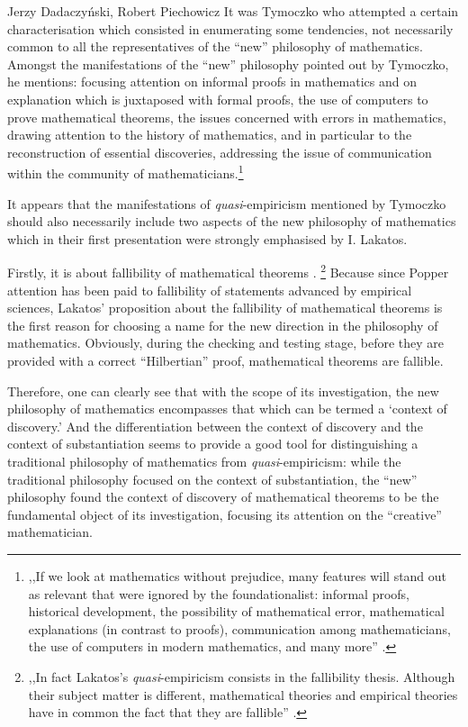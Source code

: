 \begin{artengenv}{Jerzy Dadaczyński, Robert Piechowicz}
It was Tymoczko who attempted a certain characterisation which consisted in enumerating some tendencies, not necessarily common to all the representatives of the ``new'' philosophy of mathematics. Amongst the manifestations of the ``new'' philosophy pointed out by Tymoczko, he mentions: focusing attention on informal proofs in mathematics and on explanation which is juxtaposed with formal proofs, the use of computers to prove mathematical theorems, the issues concerned with errors in mathematics, drawing attention to the history of mathematics, and in particular to the reconstruction of essential discoveries, addressing the issue of communication within the community of mathematicians.\footnote{,,If we look at mathematics without prejudice, many features will stand out as relevant that were ignored by the foundationalist: informal proofs, historical development, the possibility of mathematical error, mathematical explanations (in contrast to proofs), communication among mathematicians, the use of computers in modern mathematics, and many more''
\parencite[][p.xvi]{tymoczko_introduction_1986}.%
}

It appears that the manifestations of \textit{quasi}-empiricism mentioned by Tymoczko should also necessarily include two aspects of the new philosophy of mathematics which in their first presentation were strongly emphasised by I. Lakatos.

Firstly, it is about fallibility of mathematical theorems
\parencite[][p.139]{lakatos_proofs_1976}.%
\footnote{,,In fact Lakatos's \textit{quasi}-empiricism consists in the fallibility thesis. Although their subject matter is different, mathematical theories and empirical theories have in common the fact that they are fallible'' 
\parencite[][p.4]{koetsier_lakatos_1991}.%
} Because since Popper attention has been paid to fallibility of statements advanced by empirical sciences, Lakatos' proposition about the fallibility of mathematical theorems is the first reason for choosing a name for the new direction in the philosophy of mathematics. Obviously, during the checking and testing stage, before they are provided with a correct ``Hilbertian'' proof, mathematical theorems are fallible.

Therefore, one can clearly see that with the scope of its investigation, the new philosophy of mathematics encompasses that which can be termed a ‘context of discovery.' And the differentiation between the context of discovery and the context of substantiation seems to provide a good tool for distinguishing a traditional philosophy of mathematics from \textit{quasi}-empiricism: while the traditional philosophy focused on the context of substantiation, the ``new'' philosophy found the context of discovery of mathematical theorems to be the fundamental object of its investigation, focusing its attention on the ``creative'' mathematician.


\end{artengenv}
